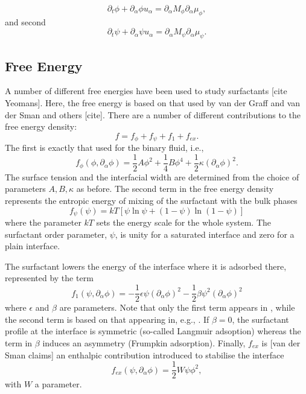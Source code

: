 \begin{equation}
\partial_t \phi + \partial_\alpha \phi u_\alpha = 
\partial_\alpha M_\phi \partial_\alpha \mu_\phi,
\end{equation}
and second
\begin{equation}
\partial_t \psi + \partial_\alpha \psi u_\alpha = 
\partial_\alpha M_\psi \partial_\alpha \mu_\psi.
\end{equation}

\subsection{Free Energy}

A number of different free energies have been used to study
surfactants [cite Yeomans]. Here, the free energy is based on
that used by van der Graff and van der Sman and others [cite].
There are a number of different contributions to the free
energy density:
\begin{equation}
f = f_\phi + f_\psi +f_1 + f_{ex}.
\end{equation}
The first is exactly that used for the binary fluid, i.e.,
\begin{equation}
f_\phi (\phi, \partial_\alpha\phi) =
{\textstyle \frac{1}{2}} A \phi^2 + {\textstyle \frac{1}{4}} B \phi^4
+ {\textstyle \frac{1}{2}} \kappa (\partial_\alpha \phi)^2.
\end{equation}
The surface tension and the interfacial width are determined from the
choice of parameters $A,B,\kappa$ as before.
The second term in the free energy density
represents the entropic
energy of mixing of the surfactant with the bulk phases
\begin{equation}
f_\psi (\psi) = kT \left[ \psi \ln\psi + (1 - \psi)\ln(1-\psi) \right]
\end{equation}
where the parameter $kT$ sets the energy scale for the whole system.
The surfactant order parameter, $\psi$, is unity for a saturated
interface and zero for a plain interface.

The surfactant lowers the energy of the interface where it is adsorbed
there, represented by the term
\begin{equation}
f_1(\psi, \partial_\alpha \phi) 
= -{\textstyle \frac{1}{2}} \epsilon \psi (\partial_\alpha \phi)^2
  -{\textstyle \frac{1}{2}} \beta  \psi^2 (\partial_\alpha \phi)^2
\end{equation}
where $\epsilon$ and $\beta$ are parameters. Note that only the
first term appears in \cite{vandergraaf}, while the second term is
based on that appearing in, e.g., \cite{diamant}. If $\beta = 0$,
the surfactant profile at the interface is symmetric (so-called
Langmuir adsoption) whereas the term in $\beta$ induces an
asymmetry (Frumpkin adsorption).
Finally,  $f_{ex}$ is [van der Sman claims]
an enthalpic contribution introduced 
to stabilise the interface \cite{theissengompper}
\begin{equation}
f_{ex} (\psi, \partial_\alpha \phi) = {\textstyle\frac{1}{2}} W \psi \phi^2,
\end{equation}
with $W$ a parameter.

